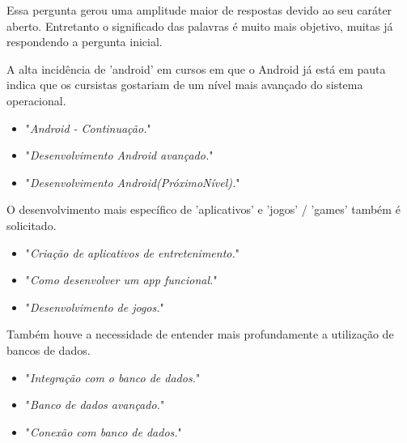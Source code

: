Essa pergunta gerou uma amplitude maior de respostas devido ao seu caráter aberto. Entretanto o significado das palavras é muito mais objetivo, muitas já respondendo a pergunta inicial.

A alta incidência de 'android' em cursos em que o Android já está em pauta indica que os cursistas gostariam de um nível mais avançado do sistema operacional.

\begin{itemize}
\item "\textit{Android - Continuação.}"
\item "\textit{Desenvolvimento Android avançado.}"
\item "\textit{Desenvolvimento Android(PróximoNível).}"
\end{itemize}

O desenvolvimento mais específico de 'aplicativos' e 'jogos' / 'games' também é solicitado.

\begin{itemize}
\item "\textit{Criação de aplicativos de entretenimento.}"
\item "\textit{Como desenvolver um app funcional.}"
\item "\textit{Desenvolvimento de jogos.}"
\end{itemize}

Também houve a necessidade de entender mais profundamente a utilização de bancos de dados.

\begin{itemize}
\item "\textit{Integração com o banco de dados.}"
\item "\textit{Banco de dados avançado.}"
\item "\textit{Conexão com banco de dados.}"
\end{itemize}

